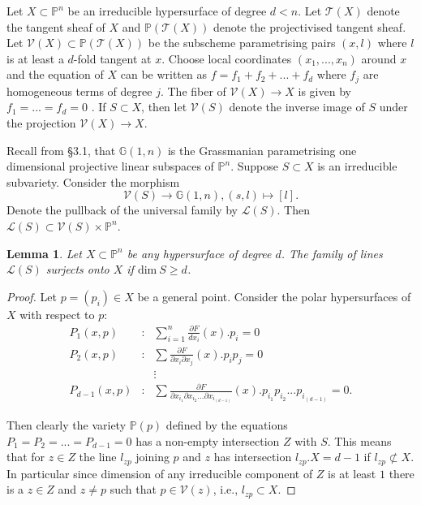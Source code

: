 \documentclass[12pt, reqno]{amsart}
\newtheorem{lemma}[theorem]{Lemma}
\begin{document}
 
Let $X\subset \mathbb{P}^n$ be an irreducible hypersurface of degree $d< n$.
Let $\mathcal{T}(X)$ denote the tangent sheaf of $X$ and $\mathbb{P} (\mathcal{T}(X))$ denote the 
projectivised tangent sheaf. Let $\mathcal{V}(X)\subset \mathbb{P} (\mathcal{T}(X))$ be the subscheme 
parametrising
pairs $(x,l)$ where $l$ is at least a $d$-fold tangent at $x$. Choose local 
coordinates $(x_1,...,x_n)$ around $x$ and the equation of $X$ can be written
as $f=f_1+f_2+...+f_d$ where $f_j$ are homogeneous terms of degree $j$.
The fiber of $\mathcal{V}(X)\longrightarrow X$ is given by $f_1=...=f_d=0$ 
\cite[p.283]{Kollar}. If $S\subset X$, then let $\mathcal{V}(S)$ denote the
inverse image of $S$ under the projection $\mathcal{V}(X)\longrightarrow X$.

Recall from \S 3.1, that $\mathbb{G}(1,n)$ is the Grassmanian parametrising one dimensional projective linear subspaces of $\mathbb{P}^{n}$. Suppose $S\subset X$ is an irreducible subvariety.
 Consider the morphism 
 $$
 \mathcal{V}(S)\longrightarrow \mathbb{G}(1,n), (s,l)\mapsto
[l].$$ 
Denote the pullback of the universal family by $\mathcal{L}(S)$. 
Then $\mathcal{L}(S)\subset \mathcal{V}(S)\times \mathbb{P}^n$. 
   
\begin{lemma}\label{4.33}
Let $X\subset \mathbb{P}^n$ be any hypersurface of degree $d$.
The family of lines $\mathcal{L}(S)$ surjects onto $X$ if $\mbox{dim}~S\geq d$.
\end{lemma}
\begin{proof} Let $p=(p_i)\in X$ be a general point.
Consider the polar hypersurfaces of $X$ with respect to $p$:
\begin{eqnarray*}
P_1(x,p) & : &\sum_{i=1}^n\frac{\partial{F}}{dx_i}(x).p_i=0 \\
P_2(x,p) & : & \sum\frac{\partial{F}}{\partial{x_i}\partial{x_j}}(x).p_ip_j=0 \\
&& \vdots \\
P_{d-1}(x,p)& : &\sum \frac{\partial{F}}{\partial{x_{i_1}}\partial{x_{i_2}}...\partial{x_{i_{(d-1)}}}}(x).p_{i_1}p_{i_2}...p_{i_{(d-1)}}=0.
\end{eqnarray*}

Then clearly the variety $\mathbb{P}(p)$ defined by the equations 
$P_1=P_2=...=P_{d-1}=0$ 
has a non-empty intersection $Z$ with $S$. This means that for $z\in Z$ the 
line 
$l_{zp}$ joining $p$ and $z$ has intersection $l_{zp}.X=d-1$ if $l_{zp}\not\subset X$. 
 In particular since dimension of any irreducible component of $Z$ is at least $1$ there is a $z\in Z$ and $z\neq p$
such that $p\in \mathcal{V}(z)$, i.e., $l_{zp}\subset X$. 
\end{proof}
\end{document}
